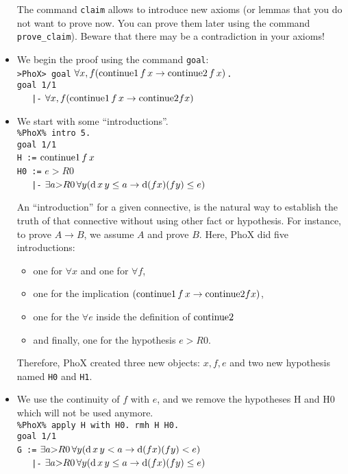 \begin{itemize}
The command \verb~claim~ allows to introduce new axioms (or lemmas that
you do not want to prove now. You can prove them later using the
command \verb~prove_claim~). Beware that there may be a contradiction
in your axioms! 

\item We begin the proof using the command \verb~goal~: \\
\verb~>PhoX> goal~ $\forall x,f (\hbox{continue1} \, f \, x \rightarrow \hbox{continue2} \, f \, x)$\verb~.~\\
\verb~goal 1/1~\\
\verb~   |-~ $\forall x,f (\hbox{continue1} \, f \, x \rightarrow
\hbox{continue2} f x)$

\item We start with some ``introductions''.\\
\verb~%PhoX% intro 5.~\\
\verb~goal 1/1~\\
\verb~H :=~ $\hbox{continue1} \, f \, x$\\
\verb~H0 :=~ $e > R0$\\
\verb~   |-~ $\exists a{>}R0  \,\forall y (\hbox{d}\,x\,y \leq a \to \hbox{d} (f x) (f y) \leq e)$

An ``introduction'' for a given connective, is the natural way to
establish the truth of that connective without using other fact
or hypothesis. For instance, to prove $A \to B$, we assume $A$ and
prove $B$. Here, PhoX did five introductions: 
\begin{itemize}
\item one for $\forall x$ and one for $\forall f$,
\item one for the implication $(\hbox{continue1} \, f \, x \rightarrow
\hbox{continue2} f x)$, 
\item one for the $\forall e$ inside the definition
of $\hbox{continue2}$ 
\item and finally, one for the hypothesis $e > R0$.
\end{itemize}

Therefore, PhoX created three new objects: $x,f,e$ and two new
hypothesis named \verb~H0~ and \verb~H1~.

\item We use the continuity of $f$ with $e$, and we remove the  hypotheses
H and H0 which will not be used anymore.\\
\verb~%PhoX% apply H with H0. rmh H H0.~\\
\verb~goal 1/1~\\
\verb~G :=~ $\exists a{>}R0 \,\forall y (\hbox{d}\,x\,y < a \to \hbox{d} (f x) (f y) < e)$\\
\verb~   |-~ $\exists a{>}R0 \,\forall y (\hbox{d}\,x\,y \leq a \to \hbox{d} (f x) (f y) \leq e)$


\end{itemize}
